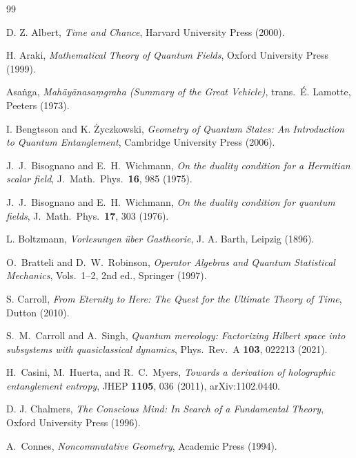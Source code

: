 \documentclass[12pt,a4paper,openany]{book}
\begin{document}
\begin{thebibliography}{99}

D. Z. Albert, \emph{Time and Chance}, Harvard University Press (2000).

H. Araki, \emph{Mathematical Theory of Quantum Fields}, Oxford University Press (1999).

Asaṅga, \emph{Mahāyānasaṃgraha (Summary of the Great Vehicle)}, trans.\ É. Lamotte, Peeters (1973).

I. Bengtsson and K. \.Zyczkowski, \emph{Geometry of Quantum States: An Introduction to Quantum Entanglement}, Cambridge University Press (2006).

J.~J.~Bisognano and E.~H.~Wichmann,
\emph{On the duality condition for a Hermitian scalar field},
J.\ Math.\ Phys.\ \textbf{16}, 985 (1975).

J.~J.~Bisognano and E.~H.~Wichmann,
\emph{On the duality condition for quantum fields},
J.\ Math.\ Phys.\ \textbf{17}, 303 (1976).

L. Boltzmann, \emph{Vorlesungen \"uber Gastheorie}, J. A. Barth, Leipzig (1896).

O.~Bratteli and D.~W.~Robinson,
\emph{Operator Algebras and Quantum Statistical Mechanics},
Vols.\ 1--2, 2nd ed., Springer (1997).

S. Carroll, \emph{From Eternity to Here: The Quest for the Ultimate Theory of Time}, Dutton (2010).

S.~M.~Carroll and A.~Singh,
\emph{Quantum mereology: Factorizing Hilbert space into subsystems with quasiclassical dynamics},
Phys.\ Rev.\ A \textbf{103}, 022213 (2021).

H.~Casini, M.~Huerta, and R.~C.~Myers,
\emph{Towards a derivation of holographic entanglement entropy},
JHEP \textbf{1105}, 036 (2011),
arXiv:1102.0440.

D. J. Chalmers, \emph{The Conscious Mind: In Search of a Fundamental Theory}, Oxford University Press (1996).


A.~Connes, \emph{Noncommutative Geometry}, Academic Press (1994).


\end{thebibliography}
\end{document}
